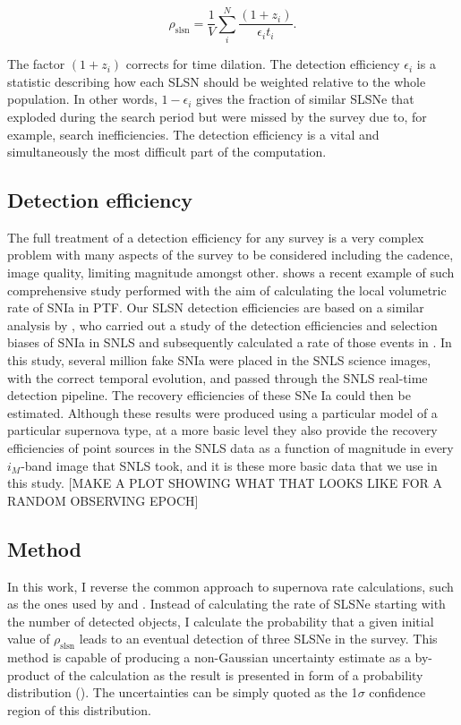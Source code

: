 \begin{equation}
\label{eq:rate}
\rho_{\mathrm{slsn}} = \frac{1}{V}\sum^{N}_{i}\frac{(1+z_i)}{\epsilon_{i}t_{i}}.
\end{equation}

The factor $(1+z_i)$ corrects for time dilation. The detection efficiency $\epsilon_i$ is a statistic describing how each SLSN should be weighted relative to the whole population. In other words, $1-\epsilon_i$ gives the fraction of similar SLSNe that exploded during the search period but were missed by the survey due to, for example, search inefficiencies. The detection efficiency is a vital and simultaneously the most difficult part of the computation.

\subsection{Detection efficiency}
The full treatment of a detection efficiency for any survey is a very complex problem with many aspects of the survey to be considered including the cadence, image quality, limiting magnitude amongst other. \citet{Frohmaier2017} shows a recent example of such comprehensive study performed with the aim of calculating the local volumetric rate of SNIa in PTF. Our SLSN detection efficiencies are based on a similar analysis by \citet{Perrett2010}, who carried out a study of the detection efficiencies and selection biases of SNIa in SNLS and subsequently calculated a rate of those events in \cite{Perrett2012}. In this study, several million fake SNIa were placed in the SNLS science images, with the correct temporal evolution, and passed through the SNLS real-time detection pipeline. The recovery efficiencies of these SNe Ia could then be estimated. Although these results were produced using a particular model of a particular supernova type, at a more basic level they also provide the recovery efficiencies of point sources in the SNLS data as a function of magnitude in every $i_M$-band image that SNLS took, and it is these more basic data that we use in this study. [MAKE A PLOT SHOWING WHAT THAT LOOKS LIKE FOR A RANDOM OBSERVING EPOCH]

\subsection{Method}
In this work, I reverse the common approach to supernova rate calculations, such as the ones used by \citet{Perrett2012} and \citep{Frohmaier2017}. Instead of calculating the rate of SLSNe starting with the number of detected objects, I calculate the probability that a given initial value of $\rho_{\mathrm{slsn}}$ leads to an eventual detection of three SLSNe in the survey. This method is capable of producing a non-Gaussian uncertainty estimate as a by-product of the calculation as the result is presented in form of a probability distribution (). The uncertainties can be simply quoted as the 1$\sigma$ confidence region of this distribution.

